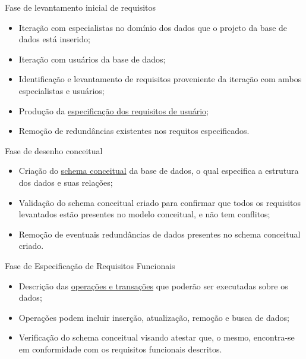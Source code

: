 \documentclass[xcolor=x11names,compress]{beamer}
\begin{document}
\begin{frame}{Fase de levantamento inicial de requisitos}

\begin{itemize}
\itemsep 5mm

\item Iteração com especialistas no domínio dos dados que o projeto da base de dados está inserido;

\item Iteração com usuários da base de dados;

\item Identificação e levantamento de requisitos proveniente da iteração com ambos especialistas e usuários;

\item Produção da \underline{especificação dos requisitos de usuário};

\item Remoção de redundâncias existentes nos requitos especificados.

\end{itemize}

\end{frame}

\begin{frame}{Fase de desenho conceitual}

\begin{itemize}
\itemsep 5mm

\item Criação do \underline{schema conceitual} da base de dados, o qual especifica a estrutura dos dados e suas relações;

\item Validação do schema conceitual criado para confirmar que todos os requisitos levantados estão presentes no modelo conceitual, e não tem conflitos;

\item Remoção de eventuais redundâncias de dados presentes no schema conceitual criado.

\end{itemize}

\end{frame}

\begin{frame}{Fase de Especificação de Requisitos Funcionais}

\begin{itemize}
\itemsep 5mm

\item Descrição das \underline{operações e transações} que poderão ser executadas sobre os dados;

\item Operações podem incluir inserção, atualização, remoção e busca de dados;

\item Verificação do schema conceitual visando atestar que, o mesmo, encontra-se em conformidade com os requisitos funcionais descritos.

\end{itemize}

\end{frame}
\end{document}

